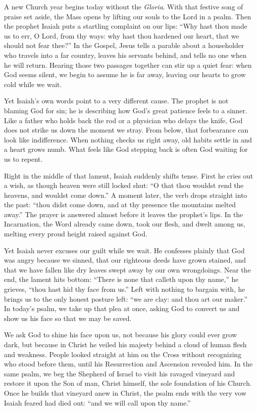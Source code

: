 A new Church year begins today without the \emph{Gloria}. With that festive song of praise set aside, the Mass opens by lifting our souls to the Lord in a psalm. Then the prophet Isaiah puts a startling complaint on our lips: ``Why hast thou made us to err, O Lord, from thy ways: why hast thou hardened our heart, that we should not fear thee?'' In the Gospel, Jesus tells a parable about a householder who travels into a far country, leaves his servants behind, and tells no one when he will return. Hearing those two passages together can stir up a quiet fear: when God seems silent, we begin to assume he is far away, leaving our hearts to grow cold while we wait.

Yet Isaiah's own words point to a very different cause. The prophet is not blaming God for sin; he is describing how God's great patience feels to a sinner. Like a father who holds back the rod or a physician who delays the knife, God does not strike us down the moment we stray. From below, that forbearance can look like indifference. When nothing checks us right away, old habits settle in and a heart grows numb. What feels like God stepping back is often God waiting for us to repent.

Right in the middle of that lament, Isaiah suddenly shifts tense. First he cries out a wish, as though heaven were still locked shut: ``O that thou wouldst rend the heavens, and wouldst come down.'' A moment later, the verb drops straight into the past: ``thou didst come down, and at thy presence the mountains melted away.'' The prayer is answered almost before it leaves the prophet's lips. In the Incarnation, the Word already came down, took our flesh, and dwelt among us, melting every proud height raised against God.

Yet Isaiah never excuses our guilt while we wait. He confesses plainly that God was angry because we sinned, that our righteous deeds have grown stained, and that we have fallen like dry leaves swept away by our own wrongdoings. Near the end, the lament hits bottom: ``There is none that calleth upon thy name,'' he grieves, ``thou hast hid thy face from us.'' Left with nothing to bargain with, he brings us to the only honest posture left: ``we are clay: and thou art our maker.'' In today's psalm, we take up that plea at once, asking God to convert us and show us his face so that we may be saved.

We ask God to shine his face upon us, not because his glory could ever grow dark, but because in Christ he veiled his majesty behind a cloud of human flesh and weakness. People looked straight at him on the Cross without recognizing who stood before them, until his Resurrection and Ascension revealed him. In the same psalm, we beg the Shepherd of Israel to visit his ravaged vineyard and restore it upon the Son of man, Christ himself, the sole foundation of his Church. Once he builds that vineyard anew in Christ, the psalm ends with the very vow Isaiah feared had died out: ``and we will call upon thy name.''

